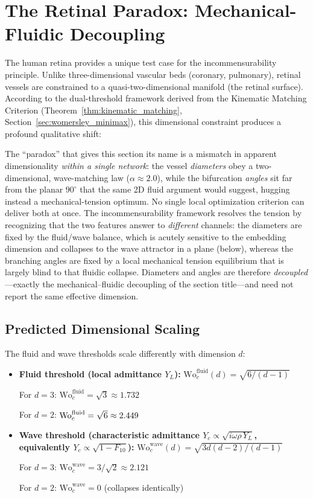 \section{The Retinal Paradox: Mechanical-Fluidic Decoupling}
\label{sec:retinal}

The human retina provides a unique test case for the incommensurability
principle. Unlike three-dimensional vascular beds (coronary, pulmonary), retinal
vessels are constrained to a quasi-two-dimensional manifold (the retinal
surface). According to the dual-threshold framework derived from the Kinematic
Matching Criterion (Theorem~\ref{thm:kinematic_matching},
Section~\ref{sec:womersley_minimax}), this dimensional constraint produces a
profound qualitative shift:

The ``paradox'' that gives this section its name is a mismatch in apparent
dimensionality \emph{within a single network}: the vessel \emph{diameters} obey
a two-dimensional, wave-matching law ($\alpha\approx 2.0$), while the
bifurcation \emph{angles} sit far from the planar $90^\circ$ that the same 2D
fluid argument would suggest, hugging instead a mechanical-tension optimum. No
single local optimization criterion can deliver both at once. The
incommensurability framework resolves the tension by recognizing that the two
features answer to \emph{different} channels: the diameters are fixed by the
fluid/wave balance, which is acutely sensitive to the embedding dimension and
collapses to the wave attractor in a plane (below), whereas the branching angles
are fixed by a local mechanical tension equilibrium that is largely blind to
that fluidic collapse. Diameters and angles are therefore
\emph{decoupled}---exactly the mechanical--fluidic decoupling of the section
title---and need not report the same effective dimension.

\subsection{Predicted Dimensional Scaling}

The fluid and wave thresholds scale differently with dimension $d$:
\begin{itemize}
    \item
\textbf{Fluid threshold (local admittance $Y_L$):}
$\mathrm{Wo}_c^{\mathrm{fluid}}(d) = \sqrt{6/(d-1)}$

For $d=3$: $\mathrm{Wo}_c^{\mathrm{fluid}} = \sqrt{3} \approx 1.732$

For $d=2$: $\mathrm{Wo}_c^{\mathrm{fluid}} = \sqrt{6} \approx 2.449$

    \item
\textbf{Wave threshold (characteristic admittance $Y_c \propto
\sqrt{i\omega\rho\,Y_L}$, equivalently $Y_c\propto\sqrt{1-F_{10}}$):}
$\mathrm{Wo}_c^{\mathrm{wave}}(d) = \sqrt{3d(d-2)/(d-1)}$

For $d=3$: $\mathrm{Wo}_c^{\mathrm{wave}} = 3/\sqrt{2} \approx 2.121$

For $d=2$: $\mathrm{Wo}_c^{\mathrm{wave}} = 0$ (collapses identically)
\end{itemize}

